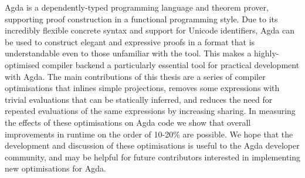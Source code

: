 Agda is a dependently-typed programming language and theorem prover,
supporting proof construction in a functional programming style.
Due to its incredibly flexible concrete syntax and support for Unicode
identifiers, Agda can be used to construct elegant and expressive
proofs in a format that is understandable even to those unfamiliar
with the tool.
This makes a highly-optimised compiler backend a particularly
essential tool for practical development with Agda.
The main contributions of this thesis are a series of compiler
optimisations that inlines simple projections, removes some
expressions with trivial evaluations that can be statically inferred,
and reduces the need for repeated evaluations of the same expressions
by increasing sharing.
In measuring the effects of these optimisations
on Agda code we show that overall improvements in runtime on the order
of 10-20\% are possible.
We hope that the development and discussion of these optimisations is
useful to the Agda developer community, and may be helpful for future
contributors interested in implementing new optimisations for Agda.
